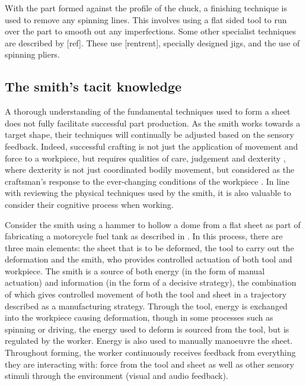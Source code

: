 With the part formed against the profile of the chuck, a finishing technique is used to remove any spinning lines. This involves using a flat sided tool to run over the part to smooth out any imperfections. Some other specialist techniques are described by [ref]. These use [rentrent], specially designed jigs, and the use of spinning pliers. 



\subsection{The smith's tacit knowledge} \label{sec:tacitknowledge}

A thorough understanding of the fundamental techniques used to form a sheet does not fully facilitate successful part production. As the smith works towards a target shape, their techniques will continually be adjusted based on the sensory feedback. Indeed, successful crafting is not just the application of movement and force to a workpiece, but requires qualities of care, judgement and dexterity \citep{Pye2008TheWorkmanship}, where dexterity is not just coordinated bodily movement, but considered as the craftsman's response to the ever-changing conditions of the workpiece \citep{Ingold2001BeyondSkill}. In line with reviewing the physical techniques used by the smith, it is also valuable to consider their cognitive process when working.

Consider the smith using a hammer to hollow a dome from a flat sheet as part of fabricating a motorcycle fuel tank as described in \citep{Barr2013ProfessionalFabrication}. In this process, there are three main elements: the sheet that is to be deformed, the tool to carry out the deformation and the smith, who provides controlled actuation of both tool and workpiece. The smith is a source of both energy (in the form of manual actuation) and information (in the form of a decisive strategy), the combination of which gives controlled movement of both the tool and sheet in a trajectory described as a manufacturing strategy. Through the tool, energy is exchanged into the workpiece causing deformation, though in some processes such as spinning or driving, the energy used to deform is sourced from the tool, but is regulated by the worker. Energy is also used to manually manoeuvre the sheet. Throughout forming, the worker continuously receives feedback from everything they are interacting with: force from the tool and sheet as well as other sensory stimuli through the environment (visual and audio feedback). 


